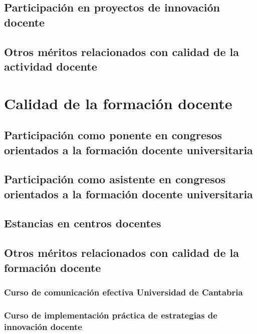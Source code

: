\documentclass[a4paper, 11pt, twoside, openright]{report}
\begin{document}
\subsection{Participación en proyectos de innovación docente}

\subsection{Otros méritos relacionados con calidad de la actividad docente}

\section{Calidad de la formación docente}

\subsection{Participación como ponente en congresos orientados a la formación docente universitaria}

\subsection{Participación como asistente en congresos orientados a la formación docente universitaria}

\subsection{Estancias en centros docentes}

\subsection{Otros méritos relacionados con calidad de la formación docente}

\subsubsection{Curso de comunicación efectiva Universidad de Cantabria}


\subsubsection{Curso de implementación práctica de estrategias de innovación docente}

\end{document}
